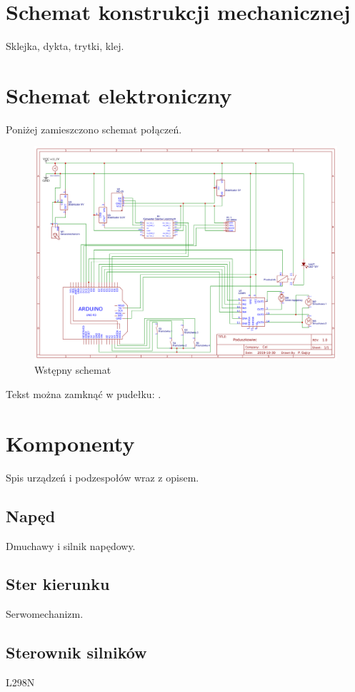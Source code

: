 \documentclass[../main/main.tex]{subfiles}
\begin{document}
\section{Schemat konstrukcji mechanicznej}
Sklejka, dykta, trytki, klej.

\section{Schemat elektroniczny}

Poniżej zamieszczono schemat połączeń.

\begin{figure}[h]
\centering
\includegraphics[width=1\textwidth]{../obrazy/schemat_aktualny.png}
\caption{Wstępny schemat}
\label{schemat_ogólny}
\end{figure}

Tekst można zamknąć w pudełku: .

\section{Komponenty}
Spis urządzeń i podzespołów wraz z opisem.

\subsection{Napęd}
Dmuchawy i silnik napędowy.

\subsection{Ster kierunku}
Serwomechanizm.

\subsection{Sterownik silników}
L298N
\end{document}
